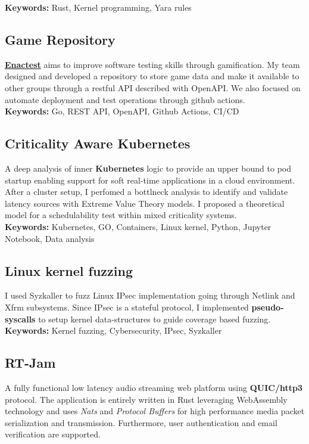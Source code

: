 \documentclass[11pt,a4paper]{article}
\begin{document}
  \textbf{Keywords:} Rust, Kernel programming, Yara rules 
  
  \subsection{Game Repository \href{https://github.com/alarmfox/game-repository}{\faGithub} \href{https://game-repository.capass.org}{\faLaptopCode}}
  \textbf{\href{https://enactest-project.eu/}{Enactest}} aims to improve software testing skills through gamification. My team designed and developed a repository to store game data and make it available to other groups through a restful API described with OpenAPI. We also focused on automate deployment and test operations through github actions. \\

  \textbf{Keywords:} Go, REST API, OpenAPI, Github Actions, CI/CD 

  \subsection{Criticality Aware Kubernetes \href{https://github.com/alarmfox/criticality-aware-kubernetes}{\faGithub}}
  A deep analysis of inner \textbf{Kubernetes} logic to provide an upper bound to pod startup enabling support for 
  soft real-time applications in a cloud environment. After a cluster setup, I perfomed a bottlneck analysis to identify and validate latency sources with Extreme Value Theory models. I proposed a theoretical model for a schedulability test within mixed criticality systems. \\

  \textbf{Keywords:} Kubernetes, GO, Containers, Linux kernel, Python, Jupyter Notebook, Data analysis

  \subsection{Linux kernel fuzzing \href{https://github.com/alarmfox/progetto-software-security}{\faGithub}}
  I used Syzkaller to fuzz Linux IPsec implementation going through Netlink and Xfrm subsystems. Since IPsec is a 
  stateful protocol, I implemented \textbf{pseudo-syscalls} to setup kernel data-structures to guide coverage based 
  fuzzing. \\

  \textbf{Keywords:} Kernel fuzzing, Cybersecurity, IPsec, Syzkaller 

  \subsection{RT-Jam \href{https://github.com/alarmfox/rt-jam}{\faGithub}}
  A fully functional low latency audio streaming web platform using \textbf{QUIC/http3} protocol. The application is entirely written in Rust leveraging WebAssembly technology and uses \textit{Nats} and \textit{Protocol Buffers} for high performance media packet serialization and transmission. Furthermore, user authentication and email verification are supported. \\
\end{document}
